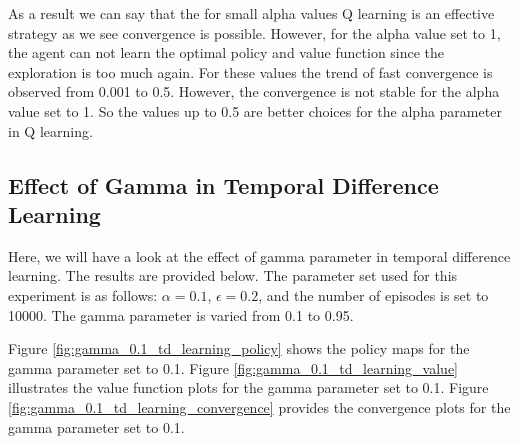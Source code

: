 \documentclass{assignment}
\begin{document}
As a result we can say that the for small alpha values Q learning is an effective strategy as we see convergence is possible. However, for the alpha value set to 1, the agent can not learn the optimal policy and value function since the exploration is too much again. For these values the trend of fast convergence is observed from 0.001 to 0.5. However, the convergence is not stable for the alpha value set to 1. So the values up to 0.5 are better choices for the alpha parameter in Q learning.


\subsection{Effect of Gamma in Temporal Difference Learning}
Here, we will have a look at the effect of gamma parameter in temporal difference learning. The results are provided below. The parameter set used for this experiment is as follows: $\alpha = 0.1$, $\epsilon = 0.2$, and the number of episodes is set to 10000. The gamma parameter is varied from 0.1 to 0.95.

Figure \ref{fig:gamma_0.1_td_learning_policy} shows the policy maps for the gamma parameter set to 0.1. Figure \ref{fig:gamma_0.1_td_learning_value} illustrates the value function plots for the gamma parameter set to 0.1. Figure \ref{fig:gamma_0.1_td_learning_convergence} provides the convergence plots for the gamma parameter set to 0.1.
\end{document}
